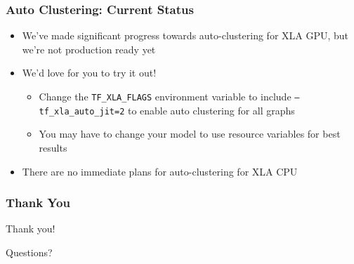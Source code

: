 \documentclass{beamer}
\begin{document}
\begin{frame}[fragile]
  \frametitle{Auto Clustering: Current Status}
  \begin{itemize}
  \item We've made significant progress towards auto-clustering for XLA GPU, but we're not production ready yet
  \item We'd love for you to try it out!
    \begin{itemize}
    \item Change the \texttt{TF\_XLA\_FLAGS} environment variable to include \texttt{--tf\_xla\_auto\_jit=2} to enable auto clustering for all graphs
    \item You may have to change your model to use resource variables for best results
    \end{itemize}
  \item There are no immediate plans for auto-clustering for XLA CPU
  \end{itemize}
\end{frame}

\begin{frame}[fragile]
  \frametitle{Thank You}

  \Huge{Thank you!}

  \Huge{Questions?}
\end{frame}
\end{document}
